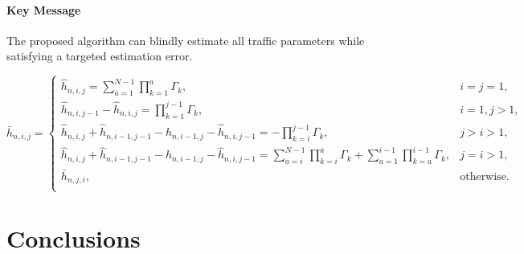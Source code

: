 \documentclass[11pt,draftclsnofoot,journal,onecolumn]{IEEEtran}
\newcounter{MYtempeqncnt}
\begin{document}
\paragraph*{Key Message}

The proposed algorithm can blindly estimate all traffic parameters while satisfying a targeted estimation error.

\begin{figure*}[!t]
\normalsize
\setcounter{MYtempeqncnt}{\value{equation}}
\setcounter{equation}{40}
\begin{equation}
\bar{h}_{n,i,j} = 
\begin{cases}
\hat{h}_{n,i,j} = \sum_{a=1}^{N-1} \prod_{k=1}^{a} \Gamma_k, & i=j=1,\\
\hat{h}_{n,i,j-1} - \hat{h}_{n,i,j} = \prod_{k=1}^{j-1} \Gamma_k, & i=1,j>1,\\
\hat{h}_{n,i,j} + \hat{h}_{n,i-1,j-1} - \hat{h}_{n,i-1,j} -\hat{h}_{n,i,j-1} = -\prod_{k=i}^{j-1} \Gamma_k, & j > i>1,\\
\hat{h}_{n,i,j} + \hat{h}_{n,i-1,j-1} - \hat{h}_{n,i-1,j} -\hat{h}_{n,i,j-1} = \sum_{a=i}^{N-1} \prod_{k=i}^{a} \Gamma_k+ \sum_{a=1}^{i-1} \prod_{k=a}^{i-1} \Gamma_k, & j = i>1,\\
\bar{h}_{n,j,i}, & \text{otherwise}.\\
\end{cases}
\label{eq:h_elements}
\end{equation}
\setcounter{equation}{\value{MYtempeqncnt}}
\hrulefill
\vspace*{4pt}
\end{figure*}

\section{Conclusions}
\label{sec:conclusions}
\end{document}
